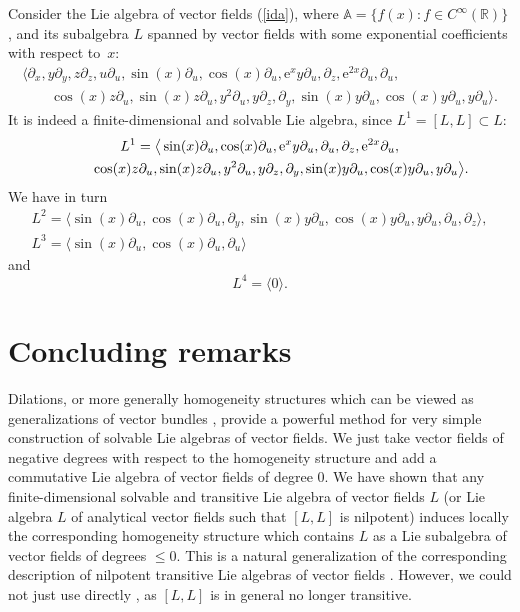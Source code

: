 \documentclass[pdftex]{sigma}
\numberwithin{equation}{section}
\begin{document}
\begin{Example}Consider the Lie algebra of vector fields (\ref{ida}), where ${\mathbb A}=\{ f(x)\colon f\in C^\infty({\mathbb R})\}$, and its subalgebra $L$ spanned by vector fields with some exponential coefficients with respect to~$x$:
\begin{gather*}
\langle \partial_x, y\partial_y, z\partial_z, u\partial_u, \sin(x)\partial_u, \cos(x)\partial_u, \mathrm{e}^xy\partial_u,\partial_z, \mathrm{e}^{2x}\partial_u, \partial_u, \\
 \qquad{} \cos(x)z\partial_u, \sin(x)z\partial_u, y^2\partial_u, y\partial_z, \partial_y, \sin(x)y\partial_u, \cos(x)y\partial_u,y\partial_u\rangle .
\end{gather*}
It is indeed a finite-dimensional and solvable Lie algebra, since $L^1=[L,L]\subset L$:
\begin{gather*}
L^1=\big\langle \sin(x)\partial_u, \cos(x)\partial_u, \mathrm{e}^xy\partial_u, \partial_u, \partial_z, \mathrm{e}^{2x}\partial_u,\\
\hphantom{L^1=\big\langle}{} \cos(x)z\partial_u, \sin(x)z\partial_u, y^2\partial_u, y\partial_z, \partial_y, \sin(x)y\partial_u, \cos(x)y\partial_u,y\partial_u\big\rangle .
\end{gather*}
We have in turn
\begin{gather*}
L^2=\langle \sin(x)\partial_u, \cos(x)\partial_u, \partial_y, \sin(x)y\partial_u, \cos(x)y\partial_u,y\partial_u, \partial_u, \partial_z\rangle ,\\
L^3=\langle \sin(x)\partial_u, \cos(x)\partial_u,\partial_u\rangle
\end{gather*}
and
\[ L^4=\langle 0\rangle .\]
\end{Example}

\section{Concluding remarks}
Dilations, or more generally homogeneity structures which can be viewed as generalizations of vector bundles \cite{Bruce:16, Grabowski:2012}, provide a powerful method for very simple construction of solvable Lie algebras of vector fields. We just take vector fields of negative degrees with respect to the homogeneity structure and add a commutative Lie algebra of vector fields of degree $0$. We have shown that any finite-dimensional solvable and transitive Lie algebra of vector fields $L$ (or Lie algebra $L$ of analytical vector fields such that $[L,L]$ is nilpotent) induces locally the corresponding homogeneity structure which contains $L$ as a Lie subalgebra of vector fields of degrees $\le 0$. This is a natural generalization of the corresponding description of nilpotent transitive Lie algebras of vector fields \cite{JG90}. However, we could not just use directly \cite{JG90}, as $[L,L]$ is in general no longer transitive.
\end{document}
